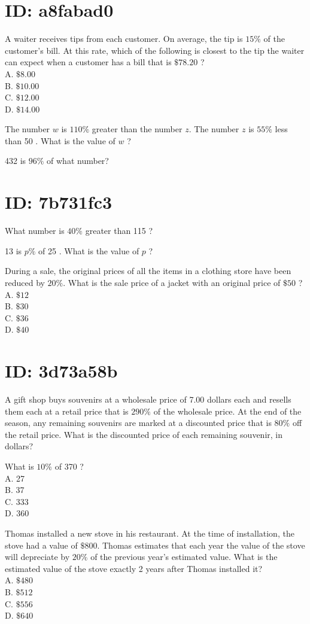 \section*{ID: a8fabad0}
A waiter receives tips from each customer. On average, the tip is $15 \%$ of the customer's bill. At this rate, which of the following is closest to the tip the waiter can expect when a customer has a bill that is $\$ 78.20$ ?\\
A. $\$ 8.00$\\
B. $\$ 10.00$\\
C. $\$ 12.00$\\
D. $\$ 14.00$

The number $w$ is $110 \%$ greater than the number $z$. The number $z$ is $55 \%$ less than 50 . What is the value of $w$ ?

432 is $96 \%$ of what number?

\section*{ID: 7b731fc3}
What number is $40 \%$ greater than 115 ?

13 is $p \%$ of 25 . What is the value of $p$ ?

During a sale, the original prices of all the items in a clothing store have been reduced by $20 \%$. What is the sale price of a jacket with an original price of $\$ 50$ ?\\
A. $\$ 12$\\
B. $\$ 30$\\
C. $\$ 36$\\
D. $\$ 40$

\section*{ID: 3d73a58b}
A gift shop buys souvenirs at a wholesale price of 7.00 dollars each and resells them each at a retail price that is $290 \%$ of the wholesale price. At the end of the season, any remaining souvenirs are marked at a discounted price that is $80 \%$ off the retail price. What is the discounted price of each remaining souvenir, in dollars?

What is $10 \%$ of 370 ?\\
A. 27\\
B. 37\\
C. 333\\
D. 360

Thomas installed a new stove in his restaurant. At the time of installation, the stove had a value of $\$ 800$. Thomas estimates that each year the value of the stove will depreciate by $20 \%$ of the previous year's estimated value. What is the estimated value of the stove exactly 2 years after Thomas installed it?\\
A. $\$ 480$\\
B. $\$ 512$\\
C. $\$ 556$\\
D. $\$ 640$

